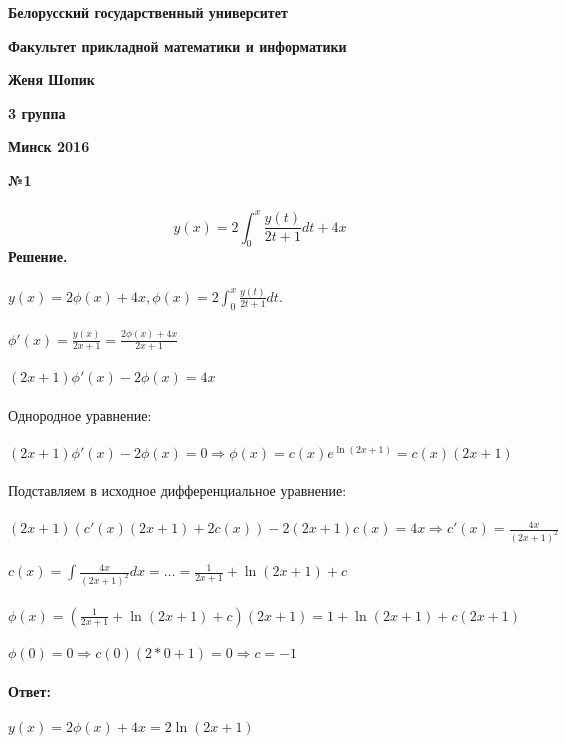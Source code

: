 \documentclass[10pt,a4paper]{article}
\begin{document}
	\begin{titlepage}
		
		\centerline{\large \bf Белорусский государственный университет}
		\centerline{\large \bf Факультет прикладной математики и информатики}
		\vfill
		\vfill
		\centerline{\Large \bf Женя Шопик}
		\centerline{\Large \bf 3 группа}
		\bigskip
		\vfill
		\bigskip
		\vfill
		\vfill
		\vfill
		\hfill
		\vfill
		\vfill
		\centerline{\Large \bf Минск 2016}
	\end{titlepage}
	\noindent\textbf{№1} \\  \\
	$$y(x) = 2\int_{0}^{x}\frac{y(t)}{2t+1}dt + 4x$$ 
	\textbf{Решение.} \\ \\
	$y(x) = 2\phi(x) + 4x, \phi(x) = 2\int_{0}^{x}\frac{y(t)}{2t+1}dt.$ \\  \\
	$\phi'(x) = \frac{y(x)}{2x+1} = \frac{2\phi(x) + 4x}{2x+1}$ \\ \\
	$(2x+1)\phi'(x) - 2\phi(x) = 4x$ \\ \\ 
	Однородное уравнение: \\ \\
	$(2x+1)\phi'(x) - 2\phi(x) = 0 \Rightarrow \phi(x) = c(x)e^{\ln(2x+1)} = c(x)(2x+1)$ \\ \\ 
	Подставляем в исходное дифференциальное уравнение: \\ \\
	$(2x + 1)(c'(x)(2x+1) + 2c(x)) - 2(2x+1)c(x) = 4x \Rightarrow c'(x) = \frac{4x}{(2x+1)^2}$ \\ \\
	$c(x) = \int\frac{4x}{(2x+1)^2}dx = \dots = \frac{1}{2x+1} + \ln(2x+1) + c$ \\ \\
	$\phi(x) = (\frac{1}{2x+1} + \ln(2x+1) + c)(2x+1) = 1 + \ln(2x+1) + c(2x+1)$ \\ \\
	$\phi(0) = 0 \Rightarrow c(0)(2*0 + 1) = 0 \Rightarrow c = -1$ \\ \\
	\textbf{Ответ:} \\ \\
	$y(x) = 2\phi(x) + 4x = 2\ln(2x+1)$ \\ \\
	
\end{document}
